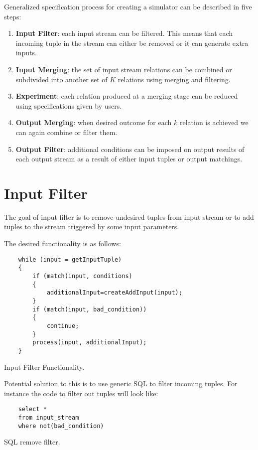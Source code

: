 \documentclass{article}
\begin{document}
Generalized specification process for creating a simulator can be described in five steps:

\begin{enumerate}
    \item {\bf Input Filter}: each input stream can be filtered. This means that each incoming tuple in the stream can either be removed or it can generate extra inputs. 
    \item {\bf Input Merging}: the set of input stream relations can be combined or subdivided into another set of $K$ relations using merging and filtering. 
    \item {\bf Experiment}: each relation produced at a merging stage can be reduced using specifications given by users.
    \item {\bf Output Merging}: when desired outcome for each $k$ relation is achieved we can again combine or filter them.
    \item {\bf Output Filter}: additional conditions can be imposed on output results of each output stream as a result of either input tuples or output matchings.
\end{enumerate}

\section{Input Filter}

The goal of input filter is to remove undesired tuples from input stream or to add tuples to the stream triggered by some input parameters.

The desired functionality is as follows:

\begin{program}
    \begin{verbatim}   
    while (input = getInputTuple)
    {
        if (match(input, conditions)
        {
            additionalInput=createAddInput(input);
        }
        if (match(input, bad_condition))
        {
            continue;
        }
        process(input, additionalInput);
    }
    \end{verbatim}
\caption{Input Filter Functionality.}
\end{program} 

Potential solution to this is to use generic SQL to filter incoming tuples. For instance the code to filter out tuples will look like:

\begin{program}
    \begin{verbatim}   
    select * 
    from input_stream
    where not(bad_condition)
    \end{verbatim}
\caption{SQL remove filter.}
\end{program}
\end{document}
